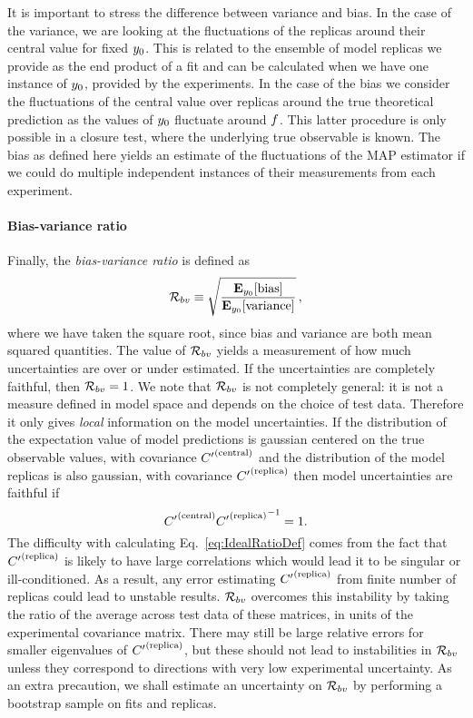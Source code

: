 It is important to stress the difference between variance and bias. In the case
of the variance, we are looking at the fluctuations of the replicas around their
central value for fixed $y_0$. This is related to the ensemble of
model replicas we provide as the end product of a fit and can be calculated when
we have one instance of $y_0$, provided by the experiments. In the
case of the bias we consider the fluctuations of the central value over replicas
around the true theoretical prediction as the values of $y_0$
fluctuate around $f$. This latter procedure is only possible in a closure
test, where the underlying true observable is known. The bias as defined here
yields an estimate of the fluctuations of the MAP estimator if we could do
multiple independent instances of their measurements from each experiment.

\paragraph{Bias-variance ratio}

Finally, the {\em bias-variance ratio} is defined as
\begin{equation}
    \label{eq:RatioDef}
    \mathcal{R}_{bv} \equiv \sqrt{\frac{
        \mathbf{E}_{y_0}[ {\rm bias} ]}{
            \mathbf{E}_{y_0}[ {\rm variance} ]}}\, ,
\end{equation}
where we have taken the square root, since bias and variance are both mean
squared quantities. The value of $\mathcal{R}_{bv}$ yields a measurement of how
much uncertainties are over or under estimated. If the uncertainties are
completely faithful, then $\mathcal{R}_{bv} = 1$. 
%
We note that $\mathcal{R}_{bv}$ is not completely general: it is not a measure
defined in model space and depends on the choice of test data. Therefore it only
gives {\em local} information on the model uncertainties. If the distribution of
the expectation value of model predictions is gaussian centered on the true
observable values, with covariance ${{C}^{\prime}}^{(\rm central)}$ and the distribution of the model
replicas is also gaussian, with covariance ${{C}^{\prime}}^{(\rm replica)}$ then model uncertainties
are faithful if
\begin{equation}\label{eq:IdealRatioDef}
    {{C}^{\prime}}^{(\rm central)} {{{C}^{\prime}}^{(\rm replica)}}^{-1} = 1.
\end{equation}
The difficulty with calculating Eq.~\ref{eq:IdealRatioDef} comes from the fact
that ${{C}^{\prime}}^{(\rm replica)}$ is likely to have large correlations which would lead it to be
singular or ill-conditioned. As a result, any error estimating ${{C}^{\prime}}^{(\rm replica)}$ from
finite number of replicas could lead to unstable results. $\mathcal{R}_{bv}$
overcomes this instability by taking the ratio of the average across test data
of these matrices, in units of the experimental covariance matrix. There may
still be large relative errors for smaller eigenvalues of ${{C}^{\prime}}^{(\rm replica)}$, but these
should not lead to instabilities in $\mathcal{R}_{bv}$ unless they correspond to
directions with very low experimental uncertainty. As an extra precaution, we
shall estimate an uncertainty on $\mathcal{R}_{bv}$ by performing a bootstrap
sample on fits and replicas.

